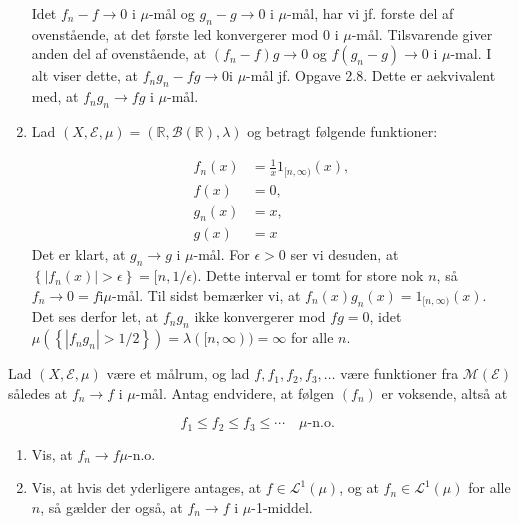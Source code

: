 \documentclass{Class}
\begin{document}
\begin{enumerate}
    
    Idet $f_n-f \rightarrow 0$ i $\mu$-mål og $g_n-g \rightarrow 0$ i $\mu$-mål, har vi jf. forste del af ovenstående, at det første led konvergerer mod 0 i $\mu$-mål. Tilsvarende giver anden del af ovenstående, at $\left(f_n-f\right) g \rightarrow 0$ og $f\left(g_n-g\right) \rightarrow 0$ i $\mu$-mal. I alt viser dette, at $f_n g_n-f g \rightarrow 0 \mathrm{i}$ $\mu$-mål jf. Opgave 2.8. Dette er aekvivalent med, at $f_n g_n \rightarrow f g$ i $\mu$-mål.
    \item Lad $(X, \mathcal{E}, \mu)=(\mathbb{R}, \mathcal{B}(\mathbb{R}), \lambda)$ og betragt følgende funktioner:

    $$
    \begin{aligned}
    f_n(x) & =\frac{1}{x} 1_{[n, \infty)}(x), \\
    f(x) & =0, \\
    g_n(x) & =x, \\
    g(x) & =x
    \end{aligned}
    $$
    Det er klart, at $g_n \rightarrow g$ i $\mu$-mål. For $\epsilon>0$ ser vi desuden, at $\left\{\left|f_n(x)\right|>\epsilon\right\}=[n, 1 / \epsilon)$. Dette interval er tomt for store nok $n$, så $f_n \rightarrow 0=f \mathrm{i} \mu$-mål. Til sidst bemærker vi, at $f_n(x) g_n(x)=1_{[n, \infty)}(x)$. Det ses derfor let, at $f_n g_n$ ikke konvergerer mod $f g=0$, idet $\mu\left(\left\{\left|f_n g_n\right|>1 / 2\right\}\right)=\lambda([n, \infty))=\infty$ for alle $n$.
\end{enumerate}




Lad $(X, \mathcal{E}, \mu)$ være et målrum, og lad $f, f_1, f_2, f_3, \ldots$ være funktioner fra $\mathcal{M}(\mathcal{E})$ således at $f_n \rightarrow f$ i $\mu$-mål. Antag endvidere, at følgen $\left(f_n\right)$ er voksende, altså at

$$
f_1 \leq f_2 \leq f_3 \leq \cdots \quad \mu \text {-n.o. }
$$
\begin{enumerate}
    \item  Vis, at $f_n \rightarrow f \mu$-n.o.
    \item Vis, at hvis det yderligere antages, at $f \in \mathcal{L}^1(\mu)$, og at $f_n \in \mathcal{L}^1(\mu)$ for alle $n$, så gælder der også, at $f_n \rightarrow f$ i $\mu$-1-middel.
\end{enumerate}
\solution
\end{document}
